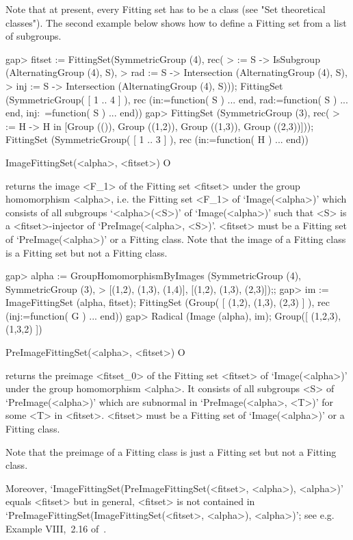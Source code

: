 Note that at present, every Fitting set has to be a class (see "Set theoretical
classes"). The second example below shows how to define a Fitting set from 
a list of subgroups.


\beginexample
gap>  fitset := FittingSet(SymmetricGroup (4), rec(
>        \in := S -> IsSubgroup (AlternatingGroup (4), S),
>        rad := S -> Intersection (AlternatingGroup (4), S),
>        inj := S -> Intersection (AlternatingGroup (4), S)));
FittingSet (SymmetricGroup( 
[ 1 .. 4 ] ), rec (in:=function( S ) ... end, rad:=function( S ) ... end, inj:\
=function( S ) ... end))
gap> FittingSet (SymmetricGroup (3), rec(
>       \in := H -> H in [Group (()), Group ((1,2)), Group ((1,3)), Group ((2,3))]));
FittingSet (SymmetricGroup( [ 1 .. 3 ] ), rec (in:=function( H ) ... end))
\endexample

\>ImageFittingSet(<alpha>, <fitset>) O

returns the image <F_1> of the Fitting set <fitset> under the group homomorphism 
<alpha>, i.e.
the Fitting set <F_1> of `Image(<alpha>)' which consists of all subgroups
`<alpha>(<S>)' of `Image(<alpha>)' such that <S> is a <fitset>-injector of 
`PreImage(<alpha>, <S>)'. <fitset> must be a Fitting set of `PreImage(<alpha>)'
or a Fitting class.  Note that the image of a Fitting class is a
Fitting set but not a Fitting class.

\beginexample
gap> alpha := GroupHomomorphismByImages (SymmetricGroup (4), SymmetricGroup (3),
>  [(1,2), (1,3), (1,4)], [(1,2), (1,3), (2,3)]);;
gap> im := ImageFittingSet (alpha, fitset);
FittingSet (Group( [ (1,2), (1,3), (2,3) 
 ] ), rec (inj:=function( G ) ... end))
gap> Radical (Image (alpha), im);
Group([ (1,2,3), (1,3,2) ])
\endexample

\>PreImageFittingSet(<alpha>, <fitset>) O

returns the preimage <fitset_0> of the Fitting set <fitset> of `Image(<alpha>)' under the group homomorphism <alpha>. It consists of all
subgroups <S> of `PreImage(<alpha>)' which are subnormal in `PreImage(<alpha>, <T>)' for some <T> in <fitset>. <fitset> must be a Fitting set of
`Image(<alpha>)' or a Fitting class. 

Note that the preimage of a Fitting class is just a Fitting set but 
not a Fitting class.

Moreover, `ImageFittingSet(PreImageFittingSet(<fitset>, <alpha>),
<alpha>)' equals <fitset> but in general, <fitset> is not contained in
`PreImageFittingSet(ImageFittingSet(<fitset>, <alpha>), <alpha>)'; see
e.g. Example VIII,~2.16 of~\cite{DH1992}.

